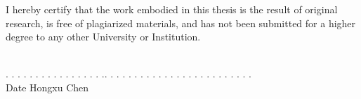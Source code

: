 I hereby certify that the work embodied in this thesis is the result of original research, is free of plagiarized materials, and has not been submitted for a higher degree to any other University or Institution.

\vspace{150pt}


 \ \  \qquad \qquad \qquad \qquad\qquad\qquad\qquad\qquad\quad \\
. . . . . . . . . . . . . . . . .\qquad \qquad \qquad \qquad\qquad \qquad . . . .  . . . . . . . . . . . . . . . . . . . . .\\
\indent \qquad Date \qquad \qquad \qquad  \qquad \qquad \qquad\qquad\qquad\qquad\qquad Hongxu Chen
